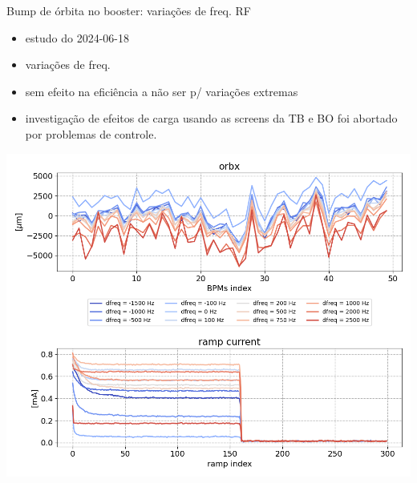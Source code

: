\begin{frame}{Bump de órbita no booster: variações de freq. RF}
\begin{minipage}{0.39\textwidth}
{\footnotesize
\begin{itemize}
    \item estudo do 2024-06-18 \href{https://cnpemcamp.sharepoint.com/:b:/s/FAC/EVB6kJl7jAZHgoUxKpIutQABaUAl3s8RLa3O1rui_7JApg?e=V9X4Yf}{}
    \item variações de freq. 
    \item sem efeito na eficiência a não ser p/ variações extremas
    \item investigação de efeitos de carga usando as screens da TB e BO foi abortado por problemas de controle.
\end{itemize}}
\end{minipage}
\begin{minipage}{0.58\textwidth}
    \includegraphics[width=\linewidth]{2024-07-12/figures/orbits_and_rampcurr_vs_dfreq.png}
\end{minipage} 
\end{frame}